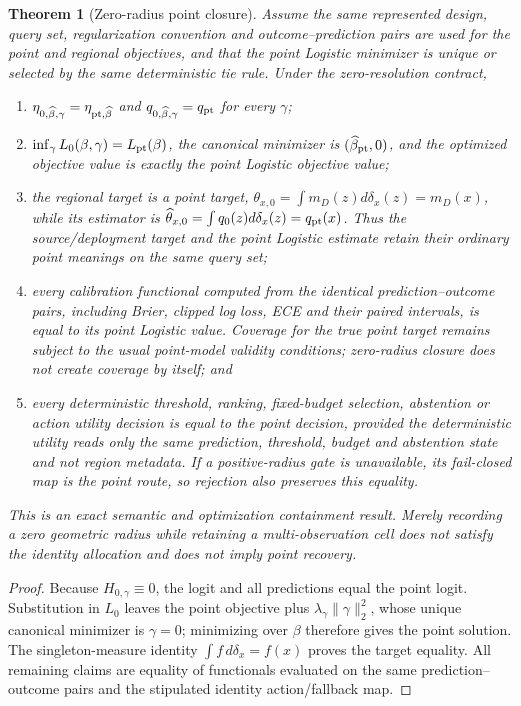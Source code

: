 \documentclass[11pt,a4paper]{article}
\numberwithin{equation}{section}
\newtheorem{theorem}{Theorem}[section]
\theoremstyle{definition}\newtheorem{definition}[theorem]{Definition}
\theoremstyle{remark}\newtheorem{remark}[theorem]{Remark}
\begin{document}
\begin{theorem}[Zero-radius point closure]
\label{thm:zero_radius_point_closure}
Assume the same represented design, query set, regularization convention and
outcome--prediction pairs are used for the point and regional objectives, and
that the point Logistic minimizer is unique or selected by the same deterministic
tie rule. Under the zero-resolution contract,
\begin{enumerate}[label=(\roman*)]
\item $\eta_{0,\widehat\beta,\gamma}=\eta_{\rm pt,\widehat\beta}$ and
$q_{0,\widehat\beta,\gamma}=q_{\rm pt}$ for every $\gamma$;
\item $\inf_\gamma L_0(\beta,\gamma)=L_{\rm pt}(\beta)$, the canonical
minimizer is $(\widehat\beta_{\rm pt},0)$, and the optimized objective value is
exactly the point Logistic objective value;
\item the regional target is a point target,
$\theta_{x,0}=\int m_D(z)d\delta_x(z)=m_D(x)$, while its estimator is
$\widehat\theta_{x,0}=\int q_{0}(z)d\delta_x(z)=q_{\rm pt}(x)$. Thus the
source/deployment target and the point Logistic estimate retain their ordinary
point meanings on the same query set;
\item every calibration functional computed from the identical prediction--outcome
pairs, including Brier, clipped log loss, ECE and their paired intervals, is equal
to its point Logistic value. Coverage for the true point target remains subject
to the usual point-model validity conditions; zero-radius closure does not create
coverage by itself; and
\item every deterministic threshold, ranking, fixed-budget selection, abstention
or action utility decision is equal to the point decision, provided the deterministic utility reads only the same prediction, threshold, budget and abstention state and not region metadata. If a positive-radius
gate is unavailable, its fail-closed map is the point route, so rejection also
preserves this equality.
\end{enumerate}
This is an exact semantic and optimization containment result. Merely recording a
zero geometric radius while retaining a multi-observation cell does not satisfy
the identity allocation and does not imply point recovery.
\end{theorem}
\begin{proof}
Because $H_{0,\gamma}\equiv0$, the logit and all predictions equal the point
logit. Substitution in $L_0$ leaves the point objective plus
$\lambda_\gamma\|\gamma\|_2^2$, whose unique canonical minimizer is $\gamma=0$;
minimizing over $\beta$ therefore gives the point solution. The singleton-measure
identity $\int f\,d\delta_x=f(x)$ proves the target equality. All remaining
claims are equality of functionals evaluated on the same prediction--outcome
pairs and the stipulated identity action/fallback map.
\end{proof}
\end{document}
